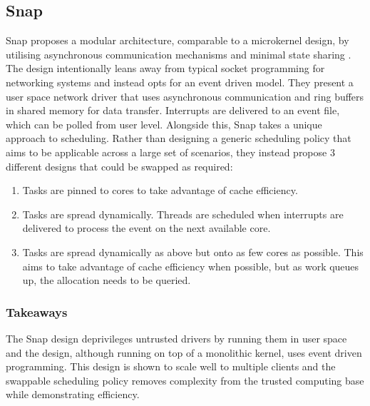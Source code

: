 \subsection{Snap}\label{snap}
Snap proposes a modular architecture, comparable to a microkernel design, by utilising asynchronous communication
mechanisms and minimal state sharing \cite{Marty_dKAABCDDEGKKKMMORRSTVWV_19}. The design intentionally leans away 
from typical socket programming for networking systems and instead opts for an event driven model. They present
a user space network driver that uses asynchronous communication and ring buffers in shared memory for data transfer.
Interrupts are delivered to an event file, which can be polled from user
level. Alongside this, Snap takes a unique approach to scheduling. Rather than
designing a generic scheduling policy that aims to be applicable across a large set of scenarios, they instead propose 3
different designs that could be swapped as required:
\begin{enumerate} 
\item Tasks are pinned to cores to take advantage of cache efficiency.
\item Tasks are spread dynamically. Threads are scheduled when interrupts are delivered to process the event on
the next available core.
\item Tasks are spread dynamically as above but onto as few cores as possible. This aims to take advantage
of cache efficiency when possible, but as work queues up, the allocation needs to be queried. 
\end{enumerate}

\subsubsection{Takeaways}
The Snap design deprivileges untrusted drivers by running them in user space and the design, although running on top
of a monolithic kernel, uses event driven programming. This design is shown to scale well to multiple clients and the
swappable scheduling policy removes complexity from the trusted computing base while demonstrating efficiency.

